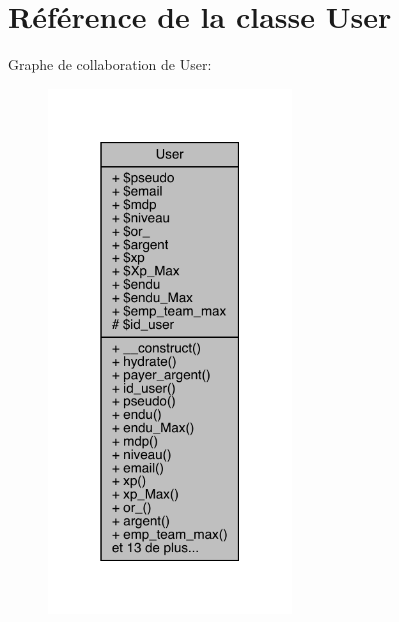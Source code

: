 \hypertarget{class_user}{}\section{Référence de la classe User}
\label{class_user}


Graphe de collaboration de User\+:\nopagebreak
\begin{figure}[H]
\begin{center}
\leavevmode
\includegraphics[width=183pt]{class_user__coll__graph}
\end{center}
\end{figure}
